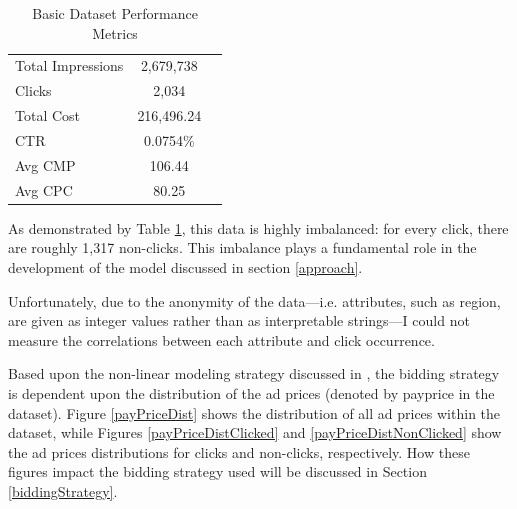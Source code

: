 \documentclass{sig-alternate-05-2015}
\begin{document}
\begin{table}[h!]
\centering
\begin{tabular}{l c c }
 \hline
 Total Impressions & 2,679,738 \\
 Clicks & 2,034 \\
 Total Cost & 216,496.24 \\
 CTR & 0.0754\% \\
 Avg CMP & 106.44 \\
 Avg CPC & 80.25 \\
 \hline
\end{tabular}
\caption{Basic Dataset Performance Metrics}
\label{dataMetrics}
\end{table}

As demonstrated by Table \ref{dataMetrics}, this data is highly imbalanced: for every click, there are roughly 1,317 non-clicks.  This imbalance plays a fundamental role in the development of the model discussed in section \ref{approach}.

Unfortunately, due to the anonymity of the data---i.e. attributes, such as region, are given as integer values rather than as interpretable strings---I could not measure the correlations between each attribute and click occurrence.

Based upon the non-linear modeling strategy discussed in \cite{nonlinear}, the bidding strategy is dependent upon the distribution of the ad prices (denoted by payprice in the dataset).  Figure \ref{payPriceDist} shows the distribution of all ad prices within the dataset, while Figures \ref{payPriceDistClicked} and \ref{payPriceDistNonClicked} show the ad prices distributions for clicks and non-clicks, respectively. How these figures impact the bidding strategy used will be discussed in Section \ref{biddingStrategy}.
\end{document}
